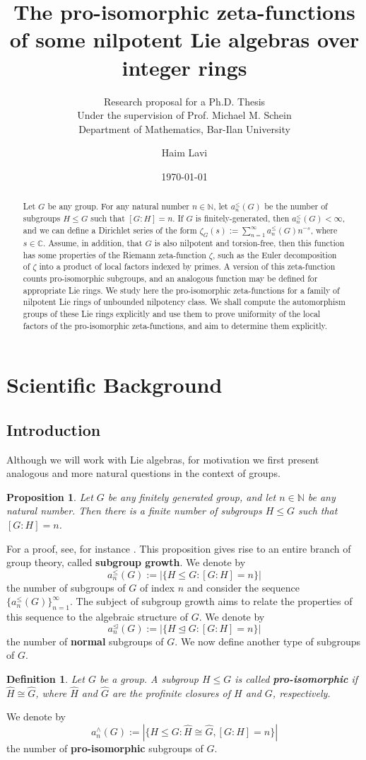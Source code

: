 \documentclass[12pt]{article}
\title{The pro-isomorphic zeta-functions of some nilpotent Lie algebras over integer rings}
\subtitle{Research proposal for a Ph.D. Thesis\\
Under the supervision of Prof. Michael M. Schein\\
Department of Mathematics, Bar-Ilan University}
\author{Haim Lavi}
\date{\today}
\newtheorem{proposition}[theorem]{Proposition}
\newtheorem{definition}[theorem]{Definition}
\begin{document}
\maketitle
\newpage
\tableofcontents
\newpage
\begin{abstract}
Let $G$ be any group. For any natural number $n\in\mathbb{N}$, let $a_{n}^{\leq}(G)$ be the number of subgroups $H\leq G$ such that $[G:H]=n$. If $G$ is finitely-generated, then $a_{n}^{\leq}(G)<\infty$, and we can define a Dirichlet series of the form $\zeta_G(s):=\sum_{n=1}^\infty a_{n}^{\leq}(G){n}^{-s}$, where $s\in\mathbb{C}$. Assume, in addition, that $G$ is also nilpotent and torsion-free, then this function has some properties of the Riemann zeta-function $\zeta$, such as the Euler decomposition of $\zeta$ into a product of local factors indexed by primes. A version of this zeta-function counts pro-isomorphic subgroups, and an analogous function may be defined for appropriate Lie rings. We study here the pro-isomorphic zeta-functions for a family of nilpotent Lie rings of unbounded nilpotency class. We shall compute the automorphism groups of these Lie rings explicitly and use them to prove uniformity of the local factors of the pro-isomorphic zeta-functions, and aim to determine them explicitly.
\end{abstract}
\section{Scientific Background}
\subsection{Introduction}
Although we will work with Lie algebras, for motivation we first present analogous and more natural questions in the context of groups.
\begin{proposition} \label{prop:finite.number.subgroups}
Let $G$ be any finitely generated group, and let $n\in\mathbb{N}$ be any natural number. Then there is a finite number of subgroups $H\leq G$ such that $[G:H]=n$.
\end{proposition}
For a proof, see, for instance \cite[Corollary 1.1.2]{LubotzkySegal}.
This proposition gives rise to an entire branch of group theory, called \textbf{subgroup growth}. We denote by \[a_{n}^{\leq}(G):=|\{H\leq{G} : [G:H]=n\}|\]
the number of subgroups of $G$ of index $n$ and consider the sequence $\{a_{n}^{\leq}(G)\}_{n=1}^{\infty}$. The subject of subgroup growth aims to relate the properties of this sequence to the algebraic structure of $G$. We denote by \[a_{n}^{\trianglelefteq}(G):=|\{H\trianglelefteq{G} : [G:H]=n\}|\]
the number of \textbf{normal} subgroups of $G$. We now define another type of subgroups of $G$.
\begin{definition}
\label{def:pro.isomorphic}
Let $G$ be a group. A subgroup $H\leq G$ is called \textbf{pro-isomorphic} if $\widehat{H}\cong\widehat{G}$, where $\widehat{H}$ and $\widehat{G}$ are the profinite closures of $H$ and $G$, respectively.
\end{definition}
We denote by \[a_{n}^{\wedge}(G):=|\{H\leq G : \widehat{H}\cong\widehat{G}, [G:H]=n\}|\]
the number of \textbf{pro-isomorphic} subgroups of $G$.
\end{document}
